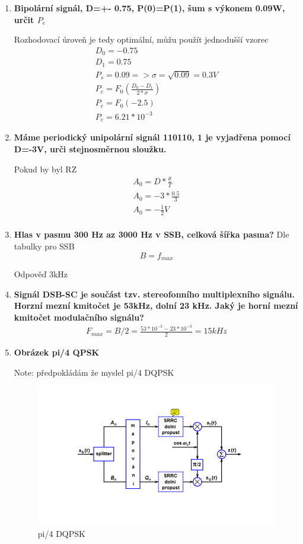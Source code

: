\begin{enumerate}
    \item \textbf{Bipolární signál, D=+- 0.75, P(0)=P(1),  šum s výkonem 0.09W, určit $P_e$}

    Rozhodovací úroveň je tedy optimální, můžu použít jednodušší vzorec
    \begin{align*}
        D_0=-0.75 \\
        D_1=0.75 \\
        P_s = 0.09 => \sigma=\sqrt{0.09}=0.3V \\
        P_e = F_0(\frac{D_0-D_1}{2*\sigma}) \\
        P_e= F_0(-2.5) \\
        P_e= 6.21*10^{-3}
    \end{align*}
    
    \item \textbf{Máme periodický unipolární signál 110110, 1 je vyjadřena pomocí D=-3V, urči stejnosměrnou sloužku.}

    Pokud by byl RZ
\begin{align*}
     A_0 = D*\frac{\theta}{T} \\
        A_0 = -3 *\frac{0.5}{3} \\
        A_0 = -\frac{1}{2}V \\
\end{align*}

\break

\item \textbf{Hlas v pasmu 300 Hz az 3000 Hz v SSB, celková šířka pasma?}
Dle tabulky pro SSB
$$B=f_{max}$$

Odpověď 3kHz

\item \textbf{Signál DSB-SC je součást tzv. stereofonního multiplexního signálu. Horzní mezní kmitočet je 53kHz, dolní 23 kHz. Jaký je horní mezní kmitočet modulačního signálu?}
\begin{align*}
    F_{max}=B/2=\frac{53*10^{-3}-23*10^{-3}}{2} = 15kHz
\end{align*}

\item \textbf{Obrázek pi/4 QPSK}

Note: předpokládám že myslel pi/4 DQPSK

\begin{figure}[h!]
    \centering
    \includegraphics{images/pi.png}
    \caption{pi/4 DQPSK}
    \label{fig:enter-label}
\end{figure}


\end{enumerate}

